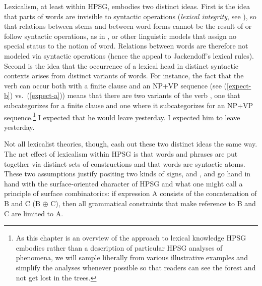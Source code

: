 \documentclass[output=paper
 	        ,biblatex
                ,babelshorthands
                ,newtxmath
                ,draftmode
                ,colorlinks, citecolor=brown
]{langscibook}
\begin{document}
Lexicalism, at least within HPSG, embodies two distinct ideas. First is the idea that parts of words
are invisible to syntactic operations (\emph{lexical integrity}, see
\citealt{BresnanandMchombo1995}), so that relations between stems and between word forms cannot be
the result of or follow syntactic operations, as in 
\citep{HalleandMarantz1993}, or other linguistic models that assign no special status to the notion
of word. Relations between words are therefore not modeled via syntactic operations (hence the
appeal to Jackendoff's lexical rules).
Second is the idea that the occurrence of a lexical head
in distinct syntactic contexts arises from distinct variants of words. For instance, the fact that
the verb  can occur both with a finite clause and an NP+VP sequence (see
(\ref{expect-b}) vs.\ (\ref{expect-a})) means that there are two variants of the verb ,
one that subcategorizes for a finite clause and one where it subcategorizes for an NP+VP
sequence.\footnote{As this chapter is an overview of the approach to lexical knowledge HPSG embodies
  rather than a description of particular HPSG analyses of phenomena, we will sample liberally from
  various illustrative examples and simplify the analyses whenever possible so that readers can see
  the forest and not get lost in the trees.} 
\eal
\ex \label{expect-b} I expected that he would leave yesterday.
\ex \label{expect-a} I expected him to leave yesterday.
\zl

\noindent
Not all lexicalist theories, though, cash out these two
distinct ideas the same way. The net effect of lexicalism within HPSG is that words and phrases are
put together via distinct sets of constructions and that words are syntactic atoms. These two
assumptions justify positing two kinds of signs,  and , and go
hand in hand with the surface-oriented character of HPSG and what one might call a principle of
surface combinatorics: if expression A consists of the concatenation of B and C (B $\oplus$ C), then
all grammatical constraints that make reference to B and C are limited to A.  
\end{document}
